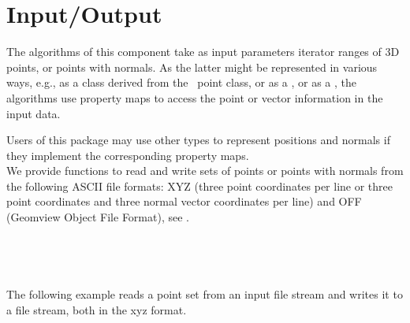 \section{Input/Output}

The algorithms of this component take as input parameters iterator ranges of 3D points, or points with normals.
As the latter might be represented in various ways, e.g., as a class derived from the \cgal\ point class, or as a 
, or as a , the
algorithms use property maps to access the point or vector information in the input data.

Users of this package may use other types to represent positions and normals if they implement the corresponding property maps. \\

We provide functions to read and write sets of points or points with normals from the following ASCII file formats: XYZ (three point coordinates  per line or three point coordinates and three normal vector coordinates  per line) and OFF (Geomview Object File Format), see \cite{cgal-off-format}. %
\\
  \\
  \\
  \\
  \\

The following example reads a point set from an input file stream and writes it to a file stream, both in the xyz format.
